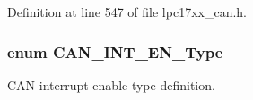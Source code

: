 \-Definition at line 547 of file lpc17xx\-\_\-can.\-h.

\hypertarget{group___c_a_n___public___types_gac1a14bd07dce4fe9df7c9d30f0449df0}{
\subsubsection[{\-C\-A\-N\-\_\-\-I\-N\-T\-\_\-\-E\-N\-\_\-\-Type}]{\setlength{\rightskip}{0pt plus 5cm}enum {\bf \-C\-A\-N\-\_\-\-I\-N\-T\-\_\-\-E\-N\-\_\-\-Type}}}\label{group___c_a_n___public___types_gac1a14bd07dce4fe9df7c9d30f0449df0}


\-C\-A\-N interrupt enable type definition. 

